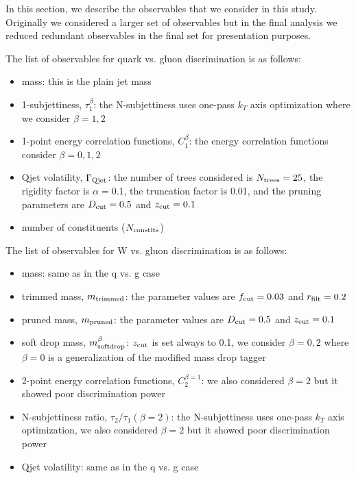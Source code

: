 \noindent
In this section, we describe the observables that we consider in this study.  
Originally we considered a larger set of observables but in the final analysis we reduced redundant observables in the final set for presentation purposes.

\noindent
The list of observables for quark vs. gluon discrimination is as follows: 
\begin{itemize}
\item mass: this is the plain jet mass
\item 1-subjettiness, $\tau_1^{\beta}$: the N-subjettiness uses one-pass $k_T$ axis optimization where we consider $\beta = 1,2$
\item 1-point energy correlation functions, $C_1^\beta$: the energy correlation functions consider $\beta=0,1,2$
\item Qjet volatility, $\Gamma_{\rm Qjet}$: the number of trees considered is $N_{\rm trees} = 25$, the rigidity factor is $\alpha = 0.1$, the truncation factor is 0.01, and the pruning parameters are $D_{\rm cut} = 0.5$ and $z_{\rm cut} = 0.1$
\item number of constituents ($N_{\rm constits}$)
\end{itemize}

\noindent
The list of observables for W vs. gluon discrimination is as follows: 
\begin{itemize}
\item mass: same as in the q vs. g case
\item trimmed mass, $m_{\rm trimmed}$: the parameter values are $f_{\rm cut} = 0.03$ and $r_{\rm filt} = 0.2$
\item pruned mass, $m_{\rm pruned}$: the parameter values are $D_{\rm cut} = 0.5$ and $z_{\rm cut} = 0.1$
\item soft drop mass, $m_{\rm soft drop}^{\beta}$: $z_{\rm cut}$ is set always to 0.1, we consider $\beta=0,2$ where $\beta=0$ is a generalization of the modified mass drop tagger
\item 2-point energy correlation functions, $C_2^{\beta=1}$: we also considered $\beta=2$ but it showed poor discrimination power
\item N-subjettiness ratio, $\tau_2 / \tau_1 (\beta = 2)$: the N-subjettiness uses one-pass $k_T$ axis optimization, we also considered $\beta=2$ but it showed poor discrimination power
\item Qjet volatility: same as in the q vs. g case
\end{itemize}

